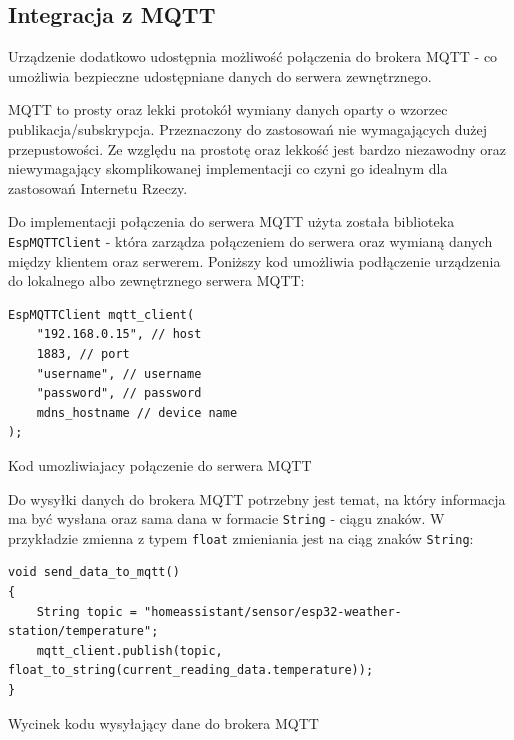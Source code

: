 \documentclass[12pt,a4paper]{article}
\begin{document}
\subsection{Integracja z MQTT}

Urządzenie dodatkowo udostępnia możliwość połączenia do brokera MQTT - co umożliwia bezpieczne udostępniane danych do serwera zewnętrznego.

MQTT to prosty oraz lekki protokół wymiany danych oparty o wzorzec publikacja/subskrypcja. Przeznaczony do zastosowań nie wymagających dużej przepustowości. Ze względu na prostotę oraz lekkość jest bardzo niezawodny oraz niewymagający skomplikowanej implementacji co czyni go idealnym dla zastosowań Internetu Rzeczy.

Do implementacji połączenia do serwera MQTT użyta została biblioteka \texttt{EspMQTTClient}\cite{esp32-mqtt-server-library} - 
która zarządza połączeniem do serwera oraz wymianą danych między klientem oraz serwerem. Poniższy kod umożliwia podłączenie urządzenia do lokalnego albo zewnętrznego serwera MQTT:
\begin{code}[H]
\begin{verbatim}
EspMQTTClient mqtt_client(
    "192.168.0.15", // host
    1883, // port
    "username", // username
    "password", // password
    mdns_hostname // device name
);
\end{verbatim}
\caption{Kod umozliwiajacy połączenie do serwera MQTT}
\label{diagnostic-data-code}
\end{code}

Do wysyłki danych do brokera MQTT potrzebny jest temat, na który informacja ma być wysłana oraz
sama dana w formacie \texttt{String} - ciągu znaków. W przykładzie zmienna z typem \texttt{float} zmieniania jest na ciąg znaków \texttt{String}:
\begin{code}[H]
\begin{verbatim}
void send_data_to_mqtt()
{
    String topic = "homeassistant/sensor/esp32-weather-station/temperature";
    mqtt_client.publish(topic, float_to_string(current_reading_data.temperature));
}
\end{verbatim}
\caption{Wycinek kodu wysyłający dane do brokera MQTT}
\label{mqtt-data-send}
\end{code}
\end{document}
